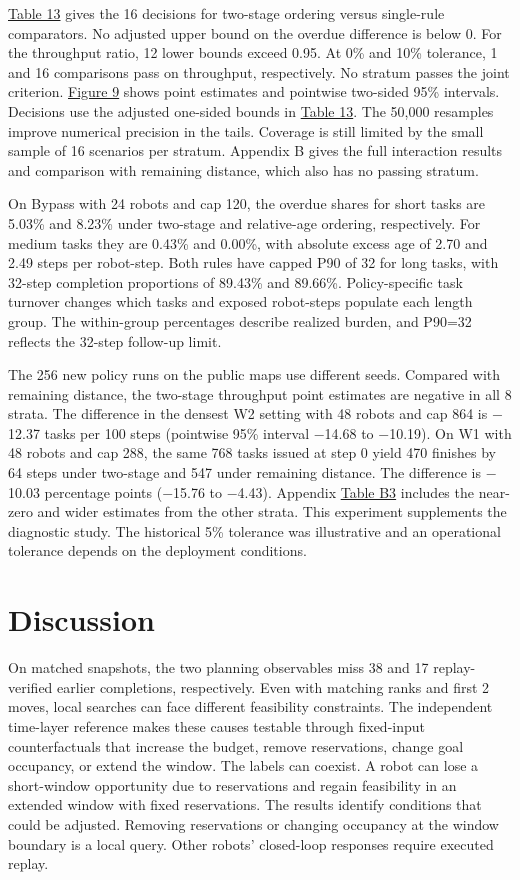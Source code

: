 \documentclass{article}
\begin{document}
\hyperlink{display:Table13}{Table 13} gives the 16 decisions for two-stage ordering versus single-rule comparators. No adjusted upper bound on the overdue difference is below 0. For the throughput ratio, 12 lower bounds exceed 0.95. At 0\% and 10\% tolerance, 1 and 16 comparisons pass on throughput, respectively. No stratum passes the joint criterion. \hyperlink{display:Figure9}{Figure 9} shows point estimates and pointwise two-sided 95\% intervals. Decisions use the adjusted one-sided bounds in \hyperlink{display:Table13}{Table 13}. The 50,000 resamples improve numerical precision in the tails. Coverage is still limited by the small sample of 16 scenarios per stratum. Appendix B gives the full interaction results and comparison with remaining distance, which also has no passing stratum.

On Bypass with 24 robots and cap 120, the overdue shares for short tasks are 5.03\% and 8.23\% under two-stage and relative-age ordering, respectively. For medium tasks they are 0.43\% and 0.00\%, with absolute excess age of 2.70 and 2.49 steps per robot-step. Both rules have capped P90 of 32 for long tasks, with 32-step completion proportions of 89.43\% and 89.66\%. Policy-specific task turnover changes which tasks and exposed robot-steps populate each length group. The within-group percentages describe realized burden, and P90=32 reflects the 32-step follow-up limit.

The 256 new policy runs on the public maps use different seeds. Compared with remaining distance, the two-stage throughput point estimates are negative in all 8 strata. The difference in the densest W2 setting with 48 robots and cap 864 is \ensuremath{-}12.37 tasks per 100 steps (pointwise 95\% interval \ensuremath{-}14.68 to \ensuremath{-}10.19). On W1 with 48 robots and cap 288, the same 768 tasks issued at step 0 yield 470 finishes by 64 steps under two-stage and 547 under remaining distance. The difference is \ensuremath{-}10.03 percentage points (\ensuremath{-}15.76 to \ensuremath{-}4.43). Appendix \hyperlink{display:TableB3}{Table B3} includes the near-zero and wider estimates from the other strata. This experiment supplements the diagnostic study. The historical 5\% tolerance was illustrative and an operational tolerance depends on the deployment conditions.

\section{Discussion}
On matched snapshots, the two planning observables miss 38 and 17 replay-verified earlier completions, respectively. Even with matching ranks and first 2 moves, local searches can face different feasibility constraints. The independent time-layer reference makes these causes testable through fixed-input counterfactuals that increase the budget, remove reservations, change goal occupancy, or extend the window. The labels can coexist. A robot can lose a short-window opportunity due to reservations and regain feasibility in an extended window with fixed reservations. The results identify conditions that could be adjusted. Removing reservations or changing occupancy at the window boundary is a local query. Other robots' closed-loop responses require executed replay.
\end{document}
